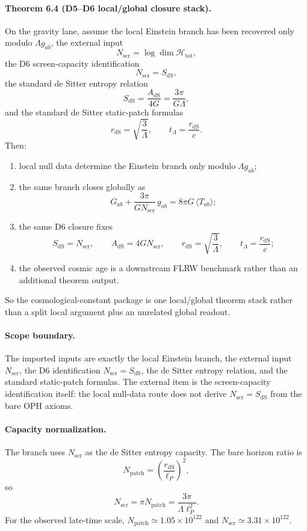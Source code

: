 \paragraph{\textbf{Theorem 6.4 (D5--D6 local/global closure stack).}}
On the gravity lane, assume the local Einstein branch has been recovered only modulo
\(\Lambda g_{ab}\), the external input
\[
N_{\mathrm{scr}}=\log \dim \mathcal H_{\mathrm{tot}},
\]
the D6 screen-capacity identification
\[
N_{\mathrm{scr}}=S_{\mathrm{dS}},
\]
\noindent the standard de Sitter entropy relation
\[
S_{\mathrm{dS}}=\frac{A_{\mathrm{dS}}}{4G}=\frac{3\pi}{G\Lambda},
\]
and the standard de Sitter static-patch formulas
\[
r_{\mathrm{dS}}=\sqrt{\frac{3}{\Lambda}},
\qquad
t_\Lambda=\frac{r_{\mathrm{dS}}}{c}.
\]
Then:
\begin{enumerate}[leftmargin=2em]
\item local null data determine the Einstein branch only modulo \(\Lambda g_{ab}\);
\item the same branch closes globally as
\[
G_{ab}+\frac{3\pi}{G N_{\mathrm{scr}}}\,g_{ab}=8\pi G\,\langle T_{ab}\rangle;
\]
\item the same D6 closure fixes
\[
S_{\mathrm{dS}}=N_{\mathrm{scr}},
\qquad
A_{\mathrm{dS}}=4G N_{\mathrm{scr}},
\qquad
r_{\mathrm{dS}}=\sqrt{\frac{3}{\Lambda}},
\qquad
t_\Lambda=\frac{r_{\mathrm{dS}}}{c};
\]
\item the observed cosmic age is a downstream FLRW benchmark rather than an additional theorem output.
\end{enumerate}
So the cosmological-constant package is one local/global theorem stack rather than a split local
argument plus an unrelated global readout.

\paragraph{\textbf{Scope boundary.}}
The imported inputs are exactly the local Einstein branch, the external input
\(N_{\mathrm{scr}}\), the D6 identification \(N_{\mathrm{scr}}=S_{\mathrm{dS}}\), the de Sitter
entropy relation, and the standard static-patch formulas. The external item is the
screen-capacity identification itself: the local null-data route does not derive
\(N_{\mathrm{scr}}=S_{\mathrm{dS}}\) from the bare OPH axioms.

\paragraph{\textbf{Capacity normalization.}}
The branch uses \(N_{\mathrm{scr}}\) as the de Sitter entropy capacity. The bare horizon ratio is
\[
N_{\mathrm{patch}}=\left(\frac{r_{\mathrm{dS}}}{\ell_P}\right)^2,
\]
so
\[
N_{\mathrm{scr}}=\pi N_{\mathrm{patch}}
=\frac{3\pi}{\Lambda\ell_P^2}.
\]
For the observed late-time scale, \(N_{\mathrm{patch}}\simeq1.05\times10^{122}\) and
\(N_{\mathrm{scr}}\simeq3.31\times10^{122}\).

